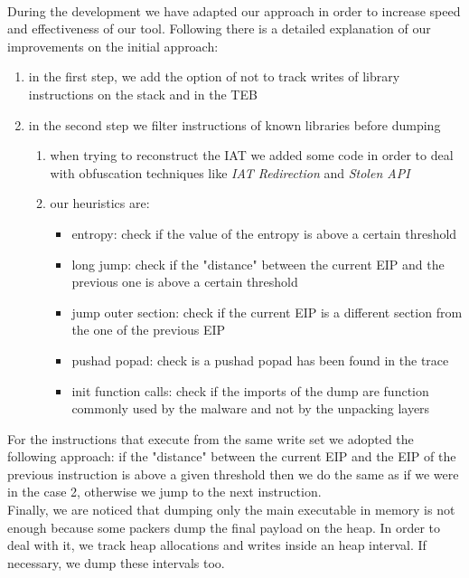 \paragraph{}
During the development we have adapted our approach in order to increase speed and effectiveness of our tool. Following there is a detailed explanation of our improvements on the initial approach:
\begin{enumerate}
\item in the first step, we add the option of not to track writes of library instructions on the stack and in the TEB
\item in the second step we filter instructions of known libraries before dumping
	\begin{enumerate}
	\item when trying to reconstruct the IAT we added some code in order to deal with 			obfuscation techniques like \textit{IAT Redirection} and \textit{Stolen API}
	\item our heuristics are:
		\begin{itemize}
		\item entropy: check if the value of the entropy is above a certain threshold
		\item long jump: check if the "distance" between the current EIP and the previous 			one is above a certain threshold
		\item jump outer section: check if the current EIP is a different section from the 		one of the previous EIP
		\item pushad popad: check is a pushad popad has been found in the trace
		\item init function calls: check if the imports of the dump are function commonly 			 used by the malware and not by the unpacking layers
		\end{itemize}
	\end{enumerate}
\end{enumerate} 
For the instructions that execute from the same write set we adopted the following approach: if the "distance" between the current EIP and the EIP of the previous instruction is above a given threshold then we do the same as if we were in the case 2, otherwise we jump to the next instruction.\\
Finally, we are noticed that dumping only the main executable in memory is not enough because some packers dump the final payload on the heap. In order to deal with it, we track heap allocations and writes inside an heap interval. If necessary, we dump these intervals too.

